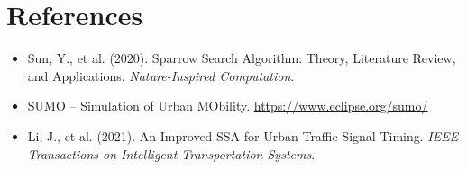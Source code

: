\documentclass[12pt]{article}
\begin{document}
\newpage
\section*{References}
\begin{itemize}[leftmargin=2em]
    \item Sun, Y., et al. (2020). Sparrow Search Algorithm: Theory, Literature Review, and Applications. \textit{Nature-Inspired Computation}.
    \item SUMO – Simulation of Urban MObility. \url{https://www.eclipse.org/sumo/}
    \item Li, J., et al. (2021). An Improved SSA for Urban Traffic Signal Timing. \textit{IEEE Transactions on Intelligent Transportation Systems}.
\end{itemize}
\end{document}
